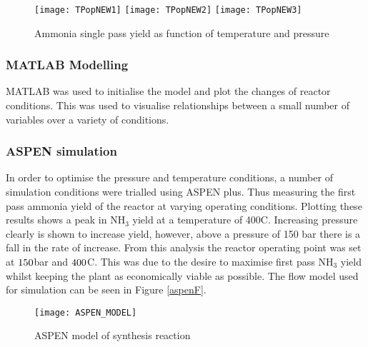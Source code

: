 {\begin{figure}[!htbp]
			\texttt{[image: TPopNEW1]}	
			\texttt{[image: TPopNEW2]}	
			\texttt{[image: TPopNEW3]}
			\caption{Ammonia single pass yield as function of temperature and pressure}	
\end{figure}}

\subsubsection{MATLAB Modelling}
MATLAB was used to initialise the model and plot the changes of reactor conditions. This was used to visualise relationships between a small number of variables over a variety of conditions.
\subsubsection{ASPEN simulation}
In order to optimise the pressure and temperature conditions, a number of simulation conditions were trialled using ASPEN plus. Thus measuring the first pass ammonia yield of the reactor at varying operating conditions. Plotting these results shows a peak in NH$_3$ yield at a temperature of 400\textdegree C. Increasing pressure clearly is shown to increase yield, however, above a pressure of 150 bar there is a fall in the rate of increase. From this analysis the reactor operating point was set at $150$bar and $400$\textdegree C. This was due to the desire to maximise first pass NH$_3$ yield whilst keeping the plant as economically viable as possible. The flow model used for simulation can be seen in Figure \ref{aspenF}.



%    
%

{\centering
	\begin{figure}[!htbp]
		\texttt{[image: ASPEN\_MODEL]}
		\caption{ASPEN model of synthesis reaction 	\label{fig:aspenF}}
\end{figure}}
